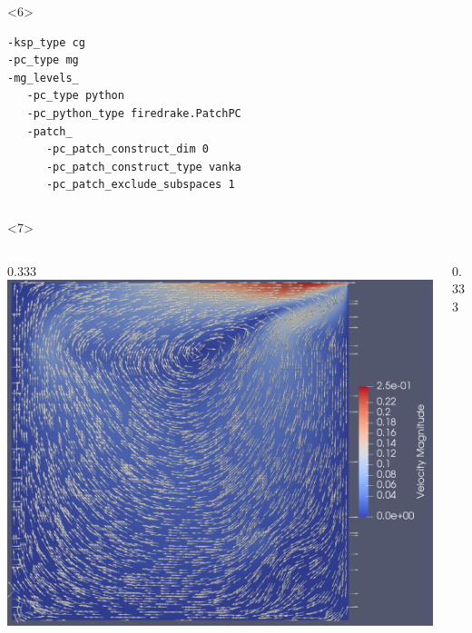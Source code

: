 \documentclass[presentation,aspectratio=43,10pt]{beamer}
\begin{document}
\begin{frame}[fragile, t]
\begin{onlyenv}
\begin{columns}
\begin{column}{0.6\textwidth}
\begin{onlyenv}
\begin{verbatim}
\end{verbatim}
        \end{onlyenv}
        \begin{onlyenv}<6>
\begin{verbatim}
-ksp_type cg
-pc_type mg
-mg_levels_
   -pc_type python
   -pc_python_type firedrake.PatchPC
   -patch_
      -pc_patch_construct_dim 0
      -pc_patch_construct_type vanka
      -pc_patch_exclude_subspaces 1
\end{verbatim}
        \end{onlyenv}
      \end{column}
    \end{columns}
  \end{onlyenv}
  \begin{onlyenv}<7>
    \begin{columns}
      \begin{column}{0.333\pagewidth}
        \includegraphics[width=\textwidth]{stokes-velocity}
      \end{column}
      \begin{column}{0.333\pagewidth}

\end{column}
\end{columns}
\end{onlyenv}
\end{frame}
\end{document}
